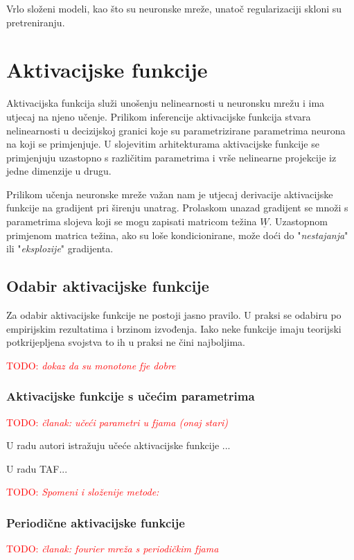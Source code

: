 \documentclass[times, utf8, numeric, diplomski]{fer}
\def\mat#1{\underline{#1}}
\def\TODO#1{\noindent\textcolor{red}{TODO: \textit{#1}}\newline}
\def\todo#1{\TODO{#1}}
\begin{document}
Vrlo složeni modeli, kao što su neuronske mreže, unatoč regularizaciji skloni su pretreniranju. \citep{intriguing_props}
\fi %

\chapter{Aktivacijske funkcije}
\label{sec:aktivacijske_fje}
Aktivacijska funkcija služi unošenju nelinearnosti u neuronsku mrežu i ima utjecaj na njeno učenje. Prilikom inferencije aktivacijske funkcija stvara nelinearnosti u decizijskoj granici koje su parametrizirane parametrima neurona na koji se primjenjuje. U slojevitim arhitekturama aktivacijske funkcije se primjenjuju uzastopno s različitim parametrima i vrše nelinearne projekcije iz jedne dimenzije u drugu.

Prilikom učenja neuronske mreže važan nam je utjecaj derivacije aktivacijske funkcije na gradijent pri širenju unatrag. Prolaskom unazad gradijent se množi s parametrima slojeva koji se mogu zapisati matricom težina $\mat{W}$. Uzastopnom primjenom matrica težina, ako su loše kondicionirane, može doći do "\textit{nestajanja}" ili "\textit{eksplozije}" gradijenta.

\section{Odabir aktivacijske funkcije}
Za odabir aktivacijske funkcije ne postoji jasno pravilo. U praksi se odabiru po empirijskim rezultatima i brzinom izvođenja. Iako neke funkcije imaju teorijski potkrijepljena svojstva to ih u praksi ne čini najboljima.

\todo{dokaz da su monotone fje dobre}

\subsection{Aktivacijske funkcije s učećim parametrima}
\todo{članak: učeći parametri u fjama (onaj stari)}

U radu \citet{trained_func} autori istražuju učeće aktivacijske funkcije ...

U radu TAF...

\todo{Spomeni i složenije metode: \citep{network_in_network}}

\subsection{Periodične aktivacijske funkcije}
\todo{članak: fourier mreža s periodičkim fjama}
\end{document}
